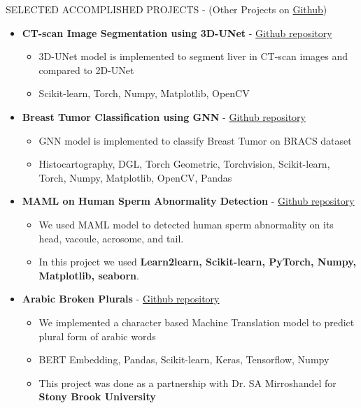 \documentclass[]{CV}
\begin{document}
\vspace{-4mm}
\begin{section}{SELECTED ACCOMPLISHED PROJECTS { - (Other Projects on \href{https://github.com/amirkasaei}{Github})}}
\begin{itemize}

\item \textbf{CT-scan Image Segmentation using 3D-UNet} - \href{https://github.com/amirkasaei/CT-scan-Image-Segmentation-using-3D-UNet}{Github repository}
   \begin{itemize}
        \item 3D-UNet model is implemented to segment liver in CT-scan images and compared to 2D-UNet
        \item Scikit-learn, Torch, Numpy, Matplotlib, OpenCV
    \end{itemize}

\item \textbf{Breast Tumor Classification using GNN} - \href{https://github.com/amirkasaei/Breast-Tumor-Classification-using-GNN}{Github repository}
   \begin{itemize}
        \item GNN model is implemented  to classify Breast Tumor on BRACS dataset
        \item Histocartography, DGL, Torch Geometric, Torchvision, Scikit-learn, Torch, Numpy, Matplotlib, OpenCV, Pandas
    \end{itemize}

\item \textbf{MAML on Human Sperm Abnormality Detection} - \href{https://github.com/amirkasaei/Modified-Human-Sperm-Morphology-Analysis}{Github repository}
\begin{itemize}
\vspace{-2mm}
     \item We used MAML model to detected human sperm abnormality on its head, vacoule, acrosome, and tail. \vspace{-2mm}
	\item In this project we used \textbf{Learn2learn, Scikit-learn, PyTorch, Numpy, Matplotlib, seaborn}.
\end{itemize}
    
\item \textbf{Arabic Broken Plurals} - \href{https://github.com/amirkasaei/Arabic-Broken-Plurals}{Github repository}
   \begin{itemize}
        \item We implemented a character based Machine Translation model to predict plural form of arabic words
        \item BERT Embedding, Pandas, Scikit-learn, Keras, Tensorflow, Numpy
        \item This project was done as a partnership with Dr. SA Mirroshandel for \textbf{Stony Brook University}
    \end{itemize}
    

\end{itemize}
\end{section}
\end{document}
